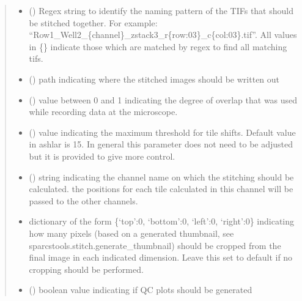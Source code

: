 \documentclass[a4paper,10pt,english,openany,oneside]{sphinxmanual}
\begin{document}
\begin{fulllineitems}
\begin{quote}
\begin{description}
\begin{itemize}
\item {} 
\sphinxAtStartPar
{} () \textendash{} Regex string to identify the naming pattern of the TIFs that should be stitched together.
For example: “Row1\_Well2\_\{channel\}\_zstack3\_r\{row:03\}\_c\{col:03\}.tif”.
All values in \{\} indicate those which are matched by regex to find all matching tifs.

\item {} 
\sphinxAtStartPar
{} () \textendash{} path indicating where the stitched images should be written out

\item {} 
\sphinxAtStartPar
{} () \textendash{} value between 0 and 1 indicating the degree of overlap that was used while recording data at the microscope.

\item {} 
\sphinxAtStartPar
{} () \textendash{} value indicating the maximum threshold for tile shifts. Default value in ashlar is 15. In general this parameter does not need to be adjusted but it is provided
to give more control.

\item {} 
\sphinxAtStartPar
{} () \textendash{} string indicating the channel name on which the stitching should be calculated. the positions for each tile calculated in this channel will be
passed to the other channels.

\item {} 
\sphinxAtStartPar
{} \textendash{} dictionary of the form \{‘top’:0, ‘bottom’:0, ‘left’:0, ‘right’:0\} indicating how many pixels (based on a generated thumbnail,
see sparcstools.stitch.generate\_thumbnail) should be cropped from the final image in each indicated dimension. Leave this set to default
if no cropping should be performed.

\item {} 
\sphinxAtStartPar
{} () \textendash{} boolean value indicating if QC plots should be generated


\end{itemize}
\end{description}
\end{quote}
\end{fulllineitems}
\end{document}
